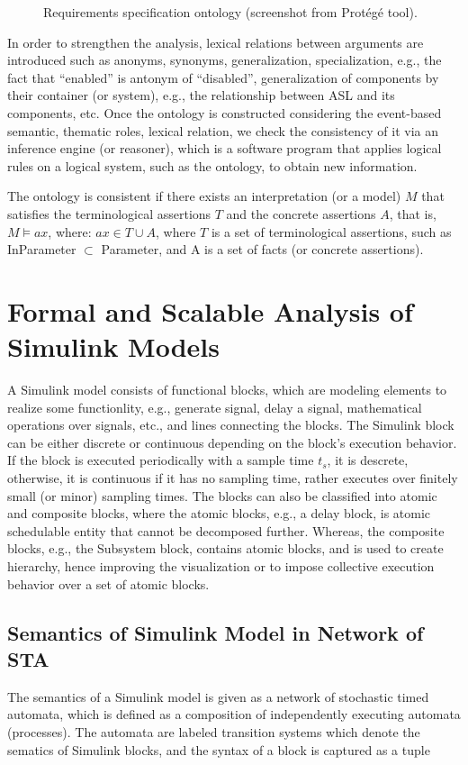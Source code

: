\begin{figure}[h]
{} 
	\caption{Requirements specification ontology (screenshot from Prot\'eg\'e tool).} \label{fig_ontology}
\end{figure}

In order to strengthen the analysis, lexical relations between arguments are introduced such as anonyms, synonyms, generalization, specialization, e.g., the fact that ``enabled'' is antonym of ``disabled'', generalization of components by their container (or system), e.g., the relationship between ASL and its components, etc. Once the ontology is constructed considering the event-based semantic, thematic roles, lexical relation, we check the consistency of it via an inference engine (or reasoner), which is a software program that applies logical rules on a logical system, such as the ontology, to obtain new information.
\begin{definition}
 The ontology is consistent if there exists an interpretation (or a model) $M$ that satisfies the terminological assertions $T$ and the concrete assertions $A$, that is, $M \models ax$, where: $ax \in T \cup A$, where $T$ is a set of terminological assertions, such as InParameter $\subset$ Parameter, and A is a set of facts (or concrete assertions).
\end{definition}

\section{Formal and Scalable Analysis of Simulink Models}
A Simulink model consists of functional blocks, which are modeling elements to realize some functionlity, e.g., generate signal, delay a signal, mathematical operations over signals, etc., and lines connecting the blocks. The Simulink block can be either discrete or continuous depending on the block's execution behavior. If the block is executed periodically with a sample time $t_s$, it is descrete, otherwise, it is continuous if it has no sampling time, rather executes over finitely small (or minor) sampling times. The blocks can also be classified into atomic and composite blocks, where the atomic blocks, e.g., a delay block, is atomic schedulable entity that cannot be decomposed further. Whereas, the composite blocks, e.g., the Subsystem block, contains atomic blocks, and is used to create hierarchy, hence improving the visualization or to impose collective execution behavior over a set of atomic blocks. 

\subsection{Semantics of Simulink Model in Network of STA} 
The semantics of a Simulink model is given as a network of stochastic timed automata, which is defined as a composition of independently executing automata (processes). The automata are labeled transition systems which denote the sematics of Simulink blocks, and the syntax of a block is captured as a tuple 

